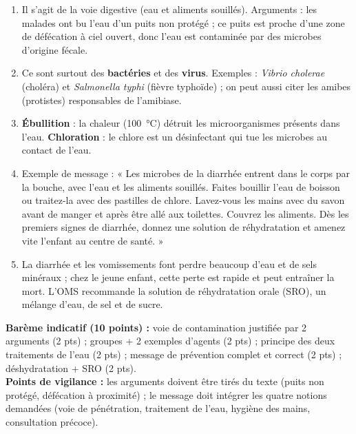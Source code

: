 \documentclass[11pt]{article}
\newcommand{\cle}[1]{{\popxbold\color{popdark}#1}}
\newcounter{popsec}
\newcounter{popsub}
\newcommand{\courssub}[1]{%
  \stepcounter{popsub}%
  \par\vspace{9pt}\noindent{\popxbold\fontsize{11.5}{13}\selectfont\color{popink}{\color{poporange}\thepopsec.\thepopsub}\hspace{6pt}#1}\par\nopagebreak\vspace{4pt}
}
\begin{document}
\courssub{Je me prépare au BEPC}

\begin{corrige}
\begin{enumerate}
\item Il s'agit de la \cle{voie digestive} (eau et aliments souillés). Arguments : les malades ont bu l'eau d'un puits non protégé ; ce puits est proche d'une zone de défécation à ciel ouvert, donc l'eau est contaminée par des microbes d'origine fécale.
\item Ce sont surtout des \textbf{bactéries} et des \textbf{virus}. Exemples : \emph{Vibrio cholerae} (choléra) et \emph{Salmonella typhi} (fièvre typhoïde) ; on peut aussi citer les amibes (protistes) responsables de l'amibiase.
\item \textbf{Ébullition} : la chaleur (\SI{100}{\celsius}) détruit les microorganismes présents dans l'eau. \textbf{Chloration} : le chlore est un désinfectant qui tue les microbes au contact de l'eau.
\item Exemple de message : « Les microbes de la diarrhée entrent dans le corps par la bouche, avec l'eau et les aliments souillés. Faites bouillir l'eau de boisson ou traitez-la avec des pastilles de chlore. Lavez-vous les mains avec du savon avant de manger et après être allé aux toilettes. Couvrez les aliments. Dès les premiers signes de diarrhée, donnez une solution de réhydratation et amenez vite l'enfant au centre de santé. »
\item La diarrhée et les vomissements font perdre beaucoup d'eau et de sels minéraux ; chez le jeune enfant, cette perte est rapide et peut entraîner la mort. L'OMS recommande la \cle{solution de réhydratation orale} (SRO), un mélange d'eau, de sel et de sucre.
\end{enumerate}
\textbf{Barème indicatif (10 points) :} voie de contamination justifiée par 2 arguments (2 pts) ; groupes + 2 exemples d'agents (2 pts) ; principe des deux traitements de l'eau (2 pts) ; message de prévention complet et correct (2 pts) ; déshydratation + SRO (2 pts).\\
\textbf{Points de vigilance :} les arguments doivent être tirés du texte (puits non protégé, défécation à proximité) ; le message doit intégrer les quatre notions demandées (voie de pénétration, traitement de l'eau, hygiène des mains, consultation précoce).
\end{corrige}
\end{document}
